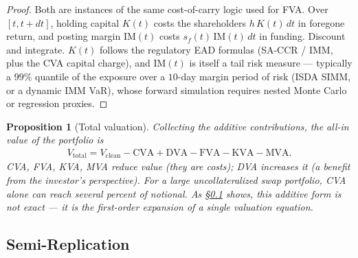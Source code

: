 \documentclass{report}
\theoremstyle{spacedplain}
\newtheorem{proposition}[theorem]{Proposition}
\theoremstyle{spaceddefinition}
\theoremstyle{spacedremark}
\begin{document}
\begin{proof}
Both are instances of the same cost-of-carry logic used for FVA. Over $[t,t+dt]$, holding capital $K(t)$ costs the shareholders $h\,K(t)\,dt$ in foregone return, and posting margin $\text{IM}(t)$ costs $s_f(t)\,\text{IM}(t)\,dt$ in funding. Discount and integrate. $K(t)$ follows the regulatory EAD formulas (SA-CCR / IMM, plus the CVA capital charge), and $\text{IM}(t)$ is itself a tail risk measure --- typically a $99\%$ quantile of the exposure over a $10$-day margin period of risk (ISDA SIMM, or a dynamic IMM VaR), whose forward simulation requires nested Monte Carlo or regression proxies.
\end{proof}

\begin{proposition}[Total valuation]
Collecting the additive contributions, the all-in value of the portfolio is
\begin{align}
    V_{\text{total}} = V_{\text{clean}} - \text{CVA} + \text{DVA} - \text{FVA} - \text{KVA} - \text{MVA}.
\end{align}
CVA, FVA, KVA, MVA reduce value (they are costs); DVA increases it (a benefit from the investor's perspective). For a large uncollateralized swap portfolio, CVA alone can reach several percent of notional. As \S\ref{sec:semirep} shows, this additive form is not exact --- it is the first-order expansion of a single valuation equation.
\end{proposition}


\subsection{Semi-Replication}\label{sec:semirep}
\end{document}
